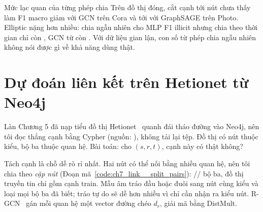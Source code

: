 

\begin{phathien}{Mức lạc quan của từng phép chia}
Trên đồ thị đóng, cắt cạnh tới nút chưa thấy làm F1 macro giảm  với GCN trên Cora và tới  với GraphSAGE trên Photo. Elliptic nặng hơn nhiều: chia ngẫu nhiên cho MLP F1 illicit  nhưng chia theo thời gian chỉ còn , GCN từ  còn . Với dữ liệu gian lận, con số từ phép chia ngẫu nhiên không nói được gì về khả năng dùng thật.
\end{phathien}

\section{Dự đoán liên kết trên Hetionet từ Neo4j}

Làn Chương 5 đã nạp tiểu đồ thị Hetionet~\cite{ch7:himmelstein2017} quanh đái tháo đường vào Neo4j, nên tôi đọc thẳng cạnh bằng Cypher
(nguồn: ), không tải lại tệp. Đồ thị có  nút thuộc  kiểu,
 bộ ba thuộc  quan hệ. Bài toán: cho $(s,r,t)$, cạnh này có thật không?


Tách cạnh là chỗ dễ rò rỉ nhất. Hai nút có thể nối bằng nhiều quan hệ, nên tôi chia theo \emph{cặp nút} (Đoạn
mã~\ref{code:ch7_link__split_pairs}): // bộ ba, đồ thị truyền tin chỉ gồm cạnh
train. Mẫu âm tráo đầu hoặc đuôi sang nút cùng kiểu và loại mọi bộ ba đã biết; tráo tự do sẽ dễ hơn nhiều vì chỉ cần nhận ra kiểu nút.
R-GCN~\cite{ch7:schlichtkrull2018} gán mỗi quan hệ một vector đường chéo $d_r$, giải mã bằng DistMult.




